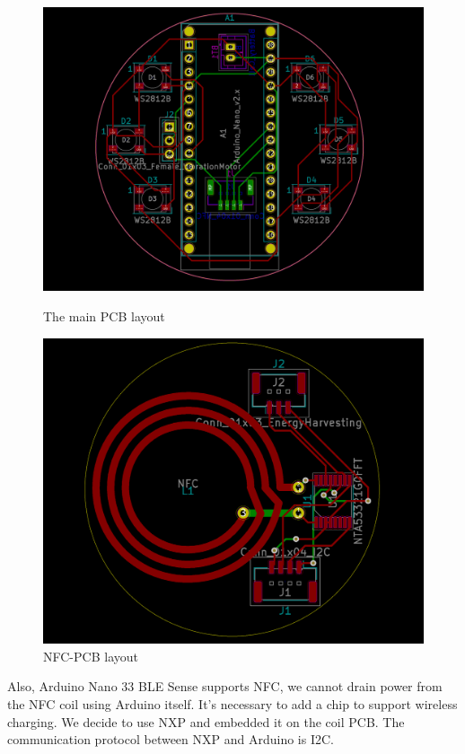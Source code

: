 \documentclass[manuscript,screen]{acmart}
\begin{document}
\begin{figure}
  \begin{minipage}{0.49\columnwidth}
    \centering
    \includegraphics[width=0.99\columnwidth]{PCB1.png}
    \caption{The main PCB layout}
    \label{PCB1}
  \end{minipage}\hfill
  \begin{minipage}{0.49\columnwidth}
    \centering
    \includegraphics[width=0.99\columnwidth]{PCB2.png}
    \caption{NFC-PCB layout}
    \label{PCB2}
  \end{minipage}
\end{figure}

Also, Arduino Nano 33 BLE Sense supports NFC, we cannot drain power from the NFC coil using Arduino itself. It's necessary to add a chip to support wireless charging. We decide to use NXP and embedded it on the coil PCB. The communication protocol between NXP and Arduino is I2C.
\end{document}

